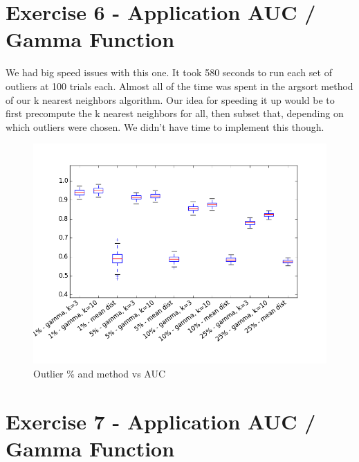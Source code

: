 \documentclass[a4paper,11pt]{article}
\begin{document}
\section*{Exercise 6 - Application AUC / Gamma Function}
We had big speed issues with this one.  It took 580 seconds to run each set of outliers at 100 trials each.  Almost all of the time was spent in the argsort method of our k nearest neighbors algorithm.  Our idea for speeding it up would be to first precompute the k nearest neighbors for all, then subset that, depending on which outliers were chosen.  We didn't have time to implement this though.
\begin{figure}[H]
  \includegraphics[width=\linewidth]{6.png}
  \caption{Outlier \% and method vs AUC}\label{fig:6}
\end{figure}

\section*{Exercise 7 - Application AUC / Gamma Function}
\end{document}
